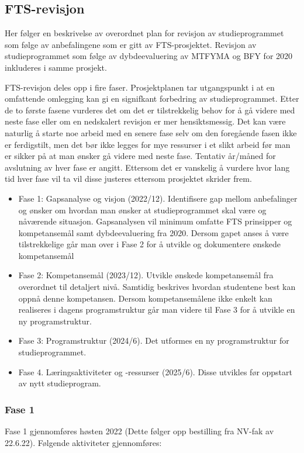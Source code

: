 \subsection{FTS-revisjon}
Her følger en beskrivelse av overordnet plan for revisjon av studieprogrammet som følge av anbefalingene som er gitt av FTS-prosjektet. Revisjon av studieprogrammet som følge av dybdeevaluering av MTFYMA og BFY for 2020 inkluderes i samme prosjekt.

FTS-revisjon deles opp i fire faser. Prosjektplanen tar utgangspunkt i at en omfattende omlegging kan gi en signifkant forbedring av studieprogrammet. Etter de to første fasene vurderes det om det er tilstrekkelig behov for å gå videre med neste fase eller om en nedskalert revisjon er mer hensiktsmessig. Det kan være naturlig å starte noe arbeid med en senere fase selv om den foregående fasen ikke er ferdigstilt, men det bør ikke legges for mye ressurser i et slikt arbeid før man er sikker på at man ønsker gå videre med neste fase. Tentativ år/måned for avslutning av hver fase er angitt. Ettersom det er vanskelig å vurdere hvor lang tid hver fase vil ta vil disse justeres ettersom prosjektet skrider frem.

\begin{itemize}
	\item Fase 1: Gapsanalyse og visjon (2022/12). Identifisere gap mellom anbefalinger og ønsker om hvordan man ønsker at studieprogrammet skal være og nåværende situasjon. Gapsanalysen vil minimum omfatte FTS prinsipper og kompetansemål samt dybdeevaluering fra 2020. Dersom gapet anses å være tilstrekkelige går man over i Fase 2 for å utvikle og dokumentere ønskede kompetansemål
	\item Fase 2: Kompetansemål (2023/12). Utvikle ønskede kompetansemål fra overordnet til detaljert nivå. Samtidig beskrives hvordan studentene best kan oppnå denne kompetansen. Dersom kompetansemålene ikke enkelt kan realiseres i dagens programstruktur går man videre til Fase 3 for å utvikle en ny programstruktur.
	\item Fase 3: Programstruktur (2024/6). Det utformes en ny programstruktur for studieprogrammet.
	\item Fase 4. Læringsaktiviteter og -ressurser (2025/6). Disse utvikles før oppstart av nytt studieprogram.
\end{itemize}

\subsubsection{Fase 1}
Fase 1 gjennomføres høsten 2022 (Dette følger opp bestilling fra NV-fak av 22.6.22). Følgende aktiviteter gjennomføres:

